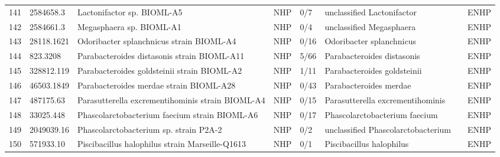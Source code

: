 \begin{longtable}{llllllll}
141 &     2584658.3 &                                               Lactonifactor sp. BIOML-A5 &   NHP &       0/7 &                     unclassified Lactonifactor &                 \cite{poyet2019library,clavel2007clostridium} &  ENHP \\
142 &     2584661.3 &                                                 Megasphaera sp. BIOML-A1 &   NHP &       0/4 &                       unclassified Megasphaera &                 \cite{poyet2019library,shetty2013comparative} &  ENHP \\
143 &    28118.1621 &                                 Odoribacter splanchnicus strain BIOML-A4 &   NHP &      0/16 &                       Odoribacter splanchnicus &                     \cite{poyet2019library,hiippala2020novel} &  ENHP \\
144 &      823.3208 &                              Parabacteroides distasonis strain BIOML-A11 &   NHP &      5/66 &                     Parabacteroides distasonis &               \cite{poyet2019library,wang2019parabacteroides} &  ENHP \\
145 &    328812.119 &                              Parabacteroides goldsteinii strain BIOML-A2 &   NHP &      1/11 &                    Parabacteroides goldsteinii &                             \cite{poyet2019library,wu2019gut} &  ENHP \\
146 &    46503.1849 &                                  Parabacteroides merdae strain BIOML-A28 &   NHP &      0/43 &                         Parabacteroides merdae &          \cite{poyet2019library,sakamoto2006reclassification} &  ENHP \\
147 &     487175.63 &                         Parasutterella excrementihominis strain BIOML-A4 &   NHP &      0/15 &               Parasutterella excrementihominis &                        \cite{poyet2019library,ju2019defining} &  ENHP \\
148 &     33025.448 &                            Phascolarctobacterium faecium strain BIOML-A6 &   NHP &      0/17 &                  Phascolarctobacterium faecium &   \cite{poyet2019library,wu2017phascolarctobacteriumafaecium} &  ENHP \\
149 &    2049039.16 &                                   Phascolarctobacterium sp. strain P2A-2 &   NHP &       0/2 &             unclassified Phascolarctobacterium &                    \cite{wu2017phascolarctobacteriumafaecium} &  ENHP \\
150 &     571933.10 &                          Piscibacillus halophilus strain Marseille-Q1613 &   NHP &       0/1 &                       Piscibacillus halophilus &                                              \cite{571933.10} &  ENHP \\

\end{longtable}
